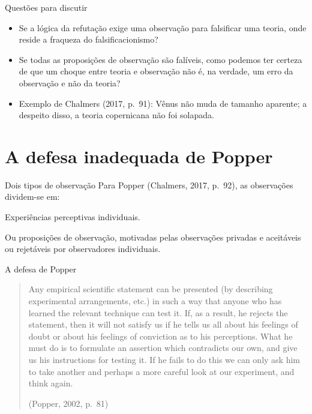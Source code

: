 \documentclass[numbering=fraction,aspectratio=169]{beamer}
\begin{document}
\begin{frame}{Questões para discutir}
  \begin{itemize}
  \item<1-> Se a lógica da refutação exige uma \alert<2>{observação} para falsificar uma teoria, onde reside \alert<1-2>{a fraqueza} do falsificacionismo?
  \item<3-> Se todas as proposições de observação são falíveis, como podemos ter certeza de que um choque entre teoria e observação não é, na verdade, \alert<3>{um erro da observação e não da teoria}?
  \item<4-> Exemplo de Chalmers (2017, p.~91): Vênus não muda de tamanho aparente; a despeito disso, \alert<4>{a teoria copernicana não foi solapada}.
  \end{itemize}
\end{frame}



\section{A defesa inadequada de Popper}

\begin{frame}{Dois tipos de observação}
  Para Popper (Chalmers, 2017, p.~92), as observações dividem-se em:

  \begin{description}
  \item<2->[Observações privadas] Experiências perceptivas individuais.
  \item<3->[Observações públicas] Ou proposições de observação, \alert{motivadas pelas observações privadas e aceitáveis ou rejetáveis por observadores individuais}.
  \end{description}
\end{frame}

\begin{frame}{A defesa de Popper}
  \begin{quote}
    Any empirical \alert<1>{scientific statement} can be presented (by describing experimental arrangements, etc.) in such a way \pause that anyone who has learned the relevant technique can \alert<2>{test it}. \pause If, as a result, he \alert<3>{rejects the statement}, \pause then it will not satisfy us if he tells us all about his \alert<4>{feelings of doubt or about his feelings of conviction} as to his perceptions. \pause What he must do is to \alert<5>{formulate an assertion which contradicts our own}, and give us his \alert<5>{instructions for testing it}. \pause If he fails to do this we can only ask him to take another and perhaps a more \alert<6>{careful look at our experiment, and think again}.

    \raggedleft
    \small (Popper, 2002, p.~81)
  \end{quote}
\end{frame}
\end{document}
